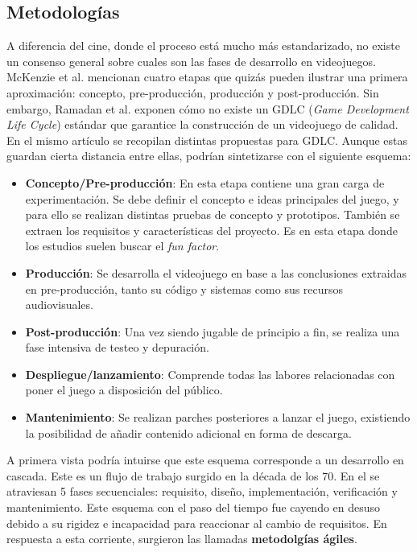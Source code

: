 \subsection{Metodologías}

A diferencia del cine, donde el proceso está mucho más estandarizado\cite{ENGSTROM201810}, no existe un consenso general sobre cuales son las fases de desarrollo en videojuegos. McKenzie et al.\cite{mckenzie} mencionan cuatro etapas que quizás pueden ilustrar una primera aproximación: concepto, pre-producción, producción y post-producción. Sin embargo, Ramadan et al.\cite{ramadan} exponen cómo no existe un GDLC (\textit{Game Development Life Cycle}) estándar que garantice la construcción de un videojuego de calidad. En el mismo artículo se recopilan distintas propuestas para GDLC. Aunque estas guardan cierta distancia entre ellas, podrían sintetizarse con el siguiente esquema:

\begin{itemize}
    \item \textbf{Concepto/Pre-producción}: En esta etapa contiene una gran carga de experimentación. Se debe definir el concepto e ideas principales del juego, y para ello se realizan distintas pruebas de concepto y prototipos. También se extraen los requisitos y características del proyecto. Es en esta etapa donde los estudios suelen buscar el \textit{fun factor}.
    \item \textbf{Producción}: Se desarrolla el videojuego en base a las conclusiones extraidas en pre-producción, tanto su código y sistemas como sus recursos audiovisuales.
    \item \textbf{Post-producción}: Una vez siendo jugable de principio a fin, se realiza una fase intensiva de testeo y depuración.
    \item \textbf{Despliegue/lanzamiento}: Comprende todas las labores relacionadas con poner el juego a disposición del público.
    \item \textbf{Mantenimiento}: Se realizan parches posteriores a lanzar el juego, existiendo la posibilidad de añadir contenido adicional en forma de descarga.
\end{itemize}

A primera vista podría intuirse que este esquema corresponde a un desarrollo en cascada\cite{waterfall}. Este es un flujo de trabajo surgido en la década de los 70. En el se atraviesan 5 fases secuenciales: requisito, diseño, implementación, verificación y mantenimiento. Este esquema con el paso del tiempo fue cayendo en desuso debido a su rigidez e incapacidad para reaccionar al cambio de requisitos. En respuesta a esta corriente, surgieron las llamadas \textbf{metodolgías ágiles}.

